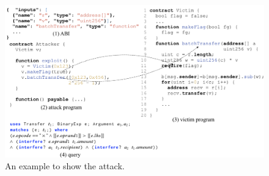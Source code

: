 \begin{figure}[!t]
  \centering
  \includegraphics[scale=0.23]{batchoverflow.png}
\caption{An example to show the \batchoverflow attack.}
\label{fig:batchcode}
\end{figure}
